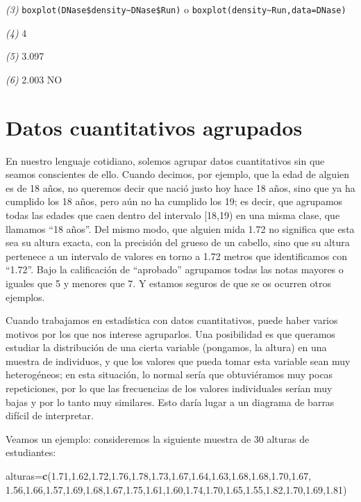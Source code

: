 \documentclass[
]{book}
\newenvironment{Shaded}{\begin{snugshade}}{\end{snugshade}}
\newcommand{\FloatTok}[1]{\textcolor[rgb]{0.00,0.00,0.81}{#1}}
\newcommand{\KeywordTok}[1]{\textcolor[rgb]{0.13,0.29,0.53}{\textbf{#1}}}
\newcommand{\NormalTok}[1]{#1}
\theoremstyle{definition}
\theoremstyle{definition}
\theoremstyle{definition}
\theoremstyle{remark}
\begin{document}
\emph{(3)} \texttt{boxplot(DNase\$density\textasciitilde{}DNase\$Run)} o \texttt{boxplot(density\textasciitilde{}Run,data=DNase)}

\emph{(4)} 4

\emph{(5)} 3.097

\emph{(6)} 2.003 NO

\hypertarget{chap:hist}{%
\chapter{Datos cuantitativos agrupados}\label{chap:hist}}

En nuestro lenguaje cotidiano, solemos agrupar datos cuantitativos sin que seamos conscientes de ello. Cuando decimos, por ejemplo, que la edad de alguien es de 18 años, no queremos decir que nació justo hoy hace 18 años, sino que ya ha cumplido los 18 años, pero aún no ha cumplido los 19; es decir, que agrupamos todas las edades que caen dentro del intervalo {[}18,19) en una misma clase, que llamamos ``18 años''. Del mismo modo, que alguien mida 1.72 no significa que esta sea su altura exacta, con la precisión del grueso de un cabello, sino que su altura pertenece a un intervalo de valores en torno a 1.72 metros que identificamos con ``1.72''. Bajo la calificación de ``aprobado'' agrupamos todas las notas mayores o iguales que 5 y menores que 7. Y estamos seguros de que se os ocurren otros ejemplos.

Cuando trabajamos en estadística con datos cuantitativos, puede haber varios motivos por los que nos interese agruparlos. Una posibilidad es que queramos estudiar la distribución de una cierta variable (pongamos, la altura) en una muestra de individuos, y que los valores que pueda tomar esta variable sean muy heterogéneos; en esta situación, lo normal sería que obtuviéramos muy pocas repeticiones, por lo que las frecuencias de los valores individuales serían muy bajas y por lo tanto muy similares. Esto daría lugar a un diagrama de barras difícil de interpretar.

Veamos un ejemplo: consideremos la siguiente muestra de 30 alturas de estudiantes:

\begin{Shaded}
\begin{Highlighting}[]
\NormalTok{alturas=}\KeywordTok{c}\NormalTok{(}\FloatTok{1.71}\NormalTok{,}\FloatTok{1.62}\NormalTok{,}\FloatTok{1.72}\NormalTok{,}\FloatTok{1.76}\NormalTok{,}\FloatTok{1.78}\NormalTok{,}\FloatTok{1.73}\NormalTok{,}\FloatTok{1.67}\NormalTok{,}\FloatTok{1.64}\NormalTok{,}\FloatTok{1.63}\NormalTok{,}\FloatTok{1.68}\NormalTok{,}\FloatTok{1.68}\NormalTok{,}\FloatTok{1.70}\NormalTok{,}\FloatTok{1.67}\NormalTok{,}
  \FloatTok{1.56}\NormalTok{,}\FloatTok{1.66}\NormalTok{,}\FloatTok{1.57}\NormalTok{,}\FloatTok{1.69}\NormalTok{,}\FloatTok{1.68}\NormalTok{,}\FloatTok{1.67}\NormalTok{,}\FloatTok{1.75}\NormalTok{,}\FloatTok{1.61}\NormalTok{,}\FloatTok{1.60}\NormalTok{,}\FloatTok{1.74}\NormalTok{,}\FloatTok{1.70}\NormalTok{,}\FloatTok{1.65}\NormalTok{,}\FloatTok{1.55}\NormalTok{,}\FloatTok{1.82}\NormalTok{,}\FloatTok{1.70}\NormalTok{,}\FloatTok{1.69}\NormalTok{,}\FloatTok{1.81}\NormalTok{)}
\end{Highlighting}
\end{Shaded}
\end{document}
